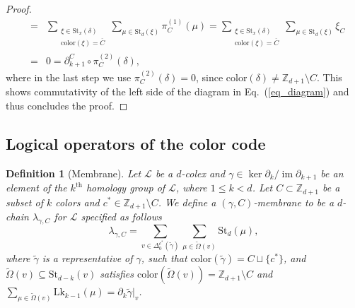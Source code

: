 \documentclass[onecolumn,letterpaper,11pt,accepted=2022-12-19]{quantumarticle}
\newcommand{\facex}[3]{{\Delta^{#1}_{#2}(#3)}}
\newcommand{\link}[2]{{\mathrm{Lk}_{#1}(#2)}}
\renewcommand{\star}[2]{{\mathrm{St}_{#1}(#2)}}
\DeclareMathOperator{\im}{im}
\newcommand{\rest}[1]{|_{#1}}
\newcommand{\col}[1]{{\mathrm{color}(#1)}}
\newtheorem{definition}{Definition}
\theoremstyle{definition}
\theoremstyle{lemma}
\theoremstyle{theorem}
\theoremstyle{corollary}
\begin{document}
{\begin{proof}
\begin{eqnarray}
&=& 
\sum_{\substack{\xi\in\star{x}{\delta} \\ \col{\xi} = \overline C} } \sum_{\mu\in\star{d}{\xi}} \pi^{(1)}_C (\mu) 
= \sum_{\substack{\xi\in\star{x}{\delta} \\ \col{\xi} = \overline C} } \sum_{\mu\in\star{d}{\xi}} \xi_C\\
&=& 0 = \partial_{k+1}^C \circ \pi^{(2)}_C (\delta),
\end{eqnarray}
where in the last step we use $\pi^{(2)}_C (\delta) = 0$, since $\col \delta \neq \mathbb{Z}_{d+1} \setminus C$.
This shows commutativity of the left side of the diagram in Eq.~(\ref{eq_diagram}) and thus concludes the proof.
\end{proof}



\subsection{Logical operators of the color code}
\label{sec_logical}

\begin{definition}[Membrane]
Let $\mathcal{L}$ be a $d$-colex and $\gamma\in \ker\partial_k / \im\partial_{k+1}$ be an element of the $k^{\textrm{th}}$ homology group of $\mathcal{L}$, where $1\leq k<d$.
Let $C\subset\mathbb{Z}_{d+1}$ be a subset of $k$ colors and $c^*\in\mathbb{Z}_{d+1}\setminus C$.
We define a $(\gamma,C)$-membrane to be a $d$-chain $\lambda_{\gamma,C}$ for $\mathcal{L}$ specified as follows
\begin{equation}
\label{eq_membrane}
\lambda_{\gamma,C} = \sum_{v\in \facex {c^*} 0 {\widetilde\gamma}} \sum_{\mu\in\widetilde\Omega(v)} \star d \mu,
\end{equation}
where $\widetilde\gamma$ is a representative of $\gamma$, such that $\col{\widetilde\gamma} = C \sqcup \{c^*\}$, and
$\widetilde\Omega(v)\subseteq \star {d-k} v$ satisfies $\col{\widetilde\Omega(v)} = \mathbb Z_{d+1}\setminus C$ and
$\sum_{\mu\in\widetilde\Omega(v)} \link {k-1} \mu = \partial_{k}\widetilde\gamma\rest v$.
\end{definition}


}
\end{document}
